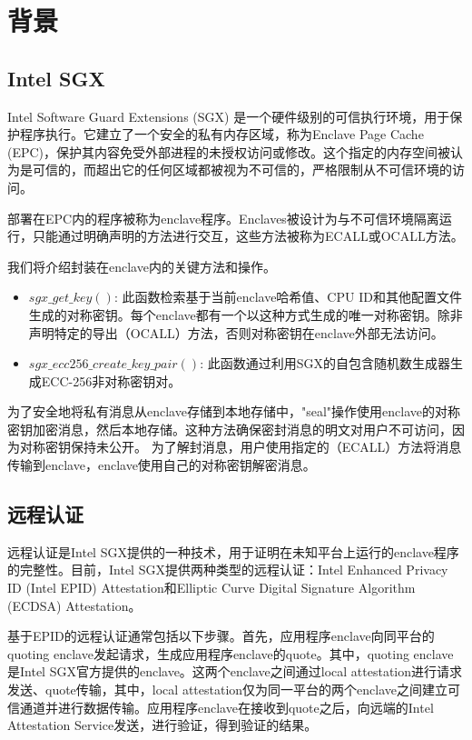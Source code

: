 \section{背景}
\subsection{Intel SGX}
Intel Software Guard Extensions (SGX) 是一个硬件级别的可信执行环境，用于保护程序执行。它建立了一个安全的私有内存区域，称为Enclave Page Cache (EPC)，保护其内容免受外部进程的未授权访问或修改。这个指定的内存空间被认为是可信的，而超出它的任何区域都被视为不可信的，严格限制从不可信环境的访问。

部署在EPC内的程序被称为enclave程序。Enclaves被设计为与不可信环境隔离运行，只能通过明确声明的方法进行交互，这些方法被称为ECALL或OCALL方法。

我们将介绍封装在enclave内的关键方法和操作。
\begin{itemize}
\item $sgx\_get\_key()$: 此函数检索基于当前enclave哈希值、CPU ID和其他配置文件生成的对称密钥。每个enclave都有一个以这种方式生成的唯一对称密钥。除非声明特定的导出（OCALL）方法，否则对称密钥在enclave外部无法访问。
\item $sgx\_ecc256\_create\_key\_pair()$: 此函数通过利用SGX的自包含随机数生成器生成ECC-256非对称密钥对。
\end{itemize}

为了安全地将私有消息从enclave存储到本地存储中，"seal"操作使用enclave的对称密钥加密消息，然后本地存储。这种方法确保密封消息的明文对用户不可访问，因为对称密钥保持未公开。
为了解封消息，用户使用指定的（ECALL）方法将消息传输到enclave，enclave使用自己的对称密钥解密消息。

\subsection{远程认证}
远程认证是Intel SGX提供的一种技术，用于证明在未知平台上运行的enclave程序的完整性。目前，Intel SGX提供两种类型的远程认证：Intel Enhanced Privacy ID (Intel EPID) Attestation和Elliptic Curve Digital Signature Algorithm (ECDSA) Attestation。

基于EPID的远程认证通常包括以下步骤。首先，应用程序enclave向同平台的quoting enclave发起请求，生成应用程序enclave的quote。其中，quoting enclave是Intel SGX官方提供的enclave。这两个enclave之间通过local attestation进行请求发送、quote传输，其中，local attestation仅为同一平台的两个enclave之间建立可信通道并进行数据传输。应用程序enclave在接收到quote之后，向远端的Intel Attestation Service发送，进行验证，得到验证的结果。


